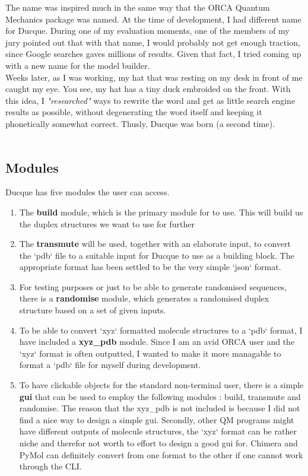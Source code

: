 \noindent The name was inspired much in the same way that the ORCA Quantum Mechanics package\cite{Neese2020Orca, Neese2022ORCA} was named.
At the time of development, I had different name for Ducque. During one of my evaluation moments, one of the members of my jury pointed out that with that name,
I would probably not get enough traction, since Google searches gaves millions of results. Given that fact, I tried coming up with a new name for the model builder.\\
Weeks later, as I was working, my hat that was resting on my desk in front of me caught my eye. You see, my hat has a tiny duck embroided on the front. With this idea, I \textit{"researched"} ways to rewrite the word and get as little search engine results as possible, without degenerating the word itself and keeping it phonetically somewhat correct. Thusly, Ducque was born (a second time).\\
\\



\subsection{Modules}
Ducque has five modules the user can access.
\begin{enumerate}[leftmargin=*]
    \setlength\itemsep{-1.5mm}
    \item The \textbf{build} module, which is the primary module for to use. This will build us the duplex structures we want to use for further 
    \item The \textbf{transmute} will be used, together with an elaborate input, to convert the `pdb` file to a suitable input for Ducque to use as a building block.
        The appropriate format has been settled to be the very simple `json` format.
    \item For testing purposes or just to be able to generate randomised sequences, there is a \textbf{randomise} module, which generates a randomised duplex structure based on a set of given inputs.
    \item To be able to convert `xyz` formatted molecule structures to a `pdb` format, I have included a \textbf{xyz\_pdb} module. Since I am an avid ORCA user and the `xyz` format is often outputted, I wanted to make it more managable to format a `pdb` file for myself during development.
    \item To have clickable objects for the standard non-terminal user, there is a simple \textbf{gui} that can be used to employ the following modules : build, transmute and randomise. The reason that the xyz\_pdb is not included is because I did not find a nice way to design a simple gui. Secondly, other QM programs might have different outputs of molecule structures, the `xyz` format can be rather niche and therefor not worth to effort to design a good gui for. Chimera and PyMol can definitely convert from one format to the other if one cannot work through the CLI.
\end{enumerate}






